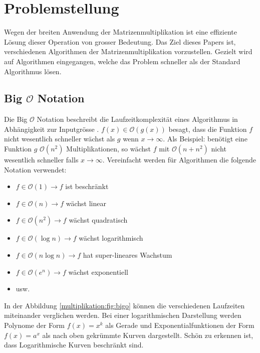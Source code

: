 %
%
%
\section{Problemstellung}
Wegen der breiten Anwendung der Matrizenmultiplikation ist eine effiziente L\"osung dieser Operation von grosser Bedeutung.
Das Ziel dieses Papers ist, verschiedenen Algorithmen der Matrizenmultiplikation vorzustellen.
Gezielt wird auf Algorithmen eingegangen, welche das Problem schneller als der Standard Algorithmus l\"osen.

\subsection{Big $\mathcal{O}$ Notation}
\label{muliplikation:sec:bigo}
Die Big $\mathcal{O}$ Notation beschreibt die Laufzeitkomplexit\"at eines Algorithmus in Abhängigkeit zur Inputgrösse \cite{multiplikation:bigo}.
$f(x) \in \mathcal{O}(g(x))$ besagt, dass die Funktion $f$ nicht wesentlich schneller w\"achst als $g$ wenn $x \rightarrow \infty$.
Als Beispiel: benötigt eine Funktion $g$ $\mathcal{O}\left(n^2 \right)$ Multiplikationen, so wächst $f$ mit $\mathcal{O}\left(n+ n^2 \right)$ nicht wesentlich schneller falls $x\to\infty$.
Vereinfacht werden f\"ur Algorithmen die folgende Notation verwendet:
\begin{itemize}
	\item $f \in \mathcal{O}(1) \rightarrow f$ ist beschr\"ankt
	\item $f \in \mathcal{O}(n) \rightarrow f$ w\"achst linear
	\item $f \in \mathcal{O}\left (n^2 \right ) \rightarrow f$ w\"achst quadratisch
	\item $f \in \mathcal{O}(\log n) \rightarrow f$ w\"achst logarithmisch
	\item $f \in \mathcal{O}(n \log n) \rightarrow f$ hat super-lineares Wachstum
	\item $f \in \mathcal{O}\left (e^n \right ) \rightarrow f$ w\"achst exponentiell
	\item usw.
\end{itemize}

In der Abbildung \ref{multiplikation:fig:bigo} k\"onnen die verschiedenen Laufzeiten miteinander verglichen werden.
Bei einer logarithmischen Darstellung werden Polynome der Form $f(x) = x^k$ als Gerade und Exponentialfunktionen der Form $f(x) = a^x$ als nach oben gekr\"ummte Kurven dargestellt.
Sch\"on zu erkennen ist, dass Logarithmische Kurven beschr\"ankt sind.


